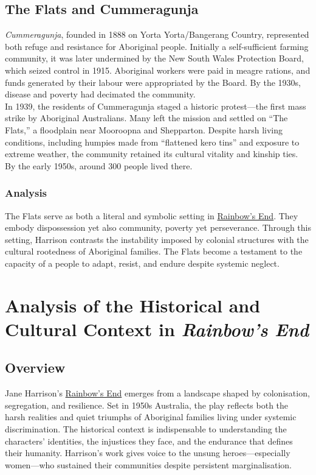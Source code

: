 \documentclass[a4paper]{article}
\begin{document}
\subsection{The Flats and Cummeragunja}
\textit{Cummeragunja}, founded in 1888 on Yorta Yorta/Bangerang Country, represented both refuge and resistance for Aboriginal people. Initially a self-sufficient farming community, it was later undermined by the New South Wales Protection Board, which seized control in 1915. Aboriginal workers were paid in meagre rations, and funds generated by their labour were appropriated by the Board. By the 1930s, disease and poverty had decimated the community.\\

In 1939, the residents of Cummeragunja staged a historic protest—the first mass strike by Aboriginal Australians. Many left the mission and settled on “The Flats,” a floodplain near Mooroopna and Shepparton. Despite harsh living conditions, including humpies made from “flattened kero tins” and exposure to extreme weather, the community retained its cultural vitality and kinship ties. By the early 1950s, around 300 people lived there.\\

\subsubsection{Analysis}
The Flats serve as both a literal and symbolic setting in \underline{Rainbow's End}. They embody dispossession yet also community, poverty yet perseverance. Through this setting, Harrison contrasts the instability imposed by colonial structures with the cultural rootedness of Aboriginal families. The Flats become a testament to the capacity of a people to adapt, resist, and endure despite systemic neglect.\\

\section{Analysis of the Historical and Cultural Context in \textit{Rainbow's End}}

\subsection{Overview}
Jane Harrison’s \underline{Rainbow's End} emerges from a landscape shaped by colonisation, segregation, and resilience. Set in 1950s Australia, the play reflects both the harsh realities and quiet triumphs of Aboriginal families living under systemic discrimination. The historical context is indispensable to understanding the characters’ identities, the injustices they face, and the endurance that defines their humanity. Harrison’s work gives voice to the unsung heroes—especially women—who sustained their communities despite persistent marginalisation.\\
\end{document}
